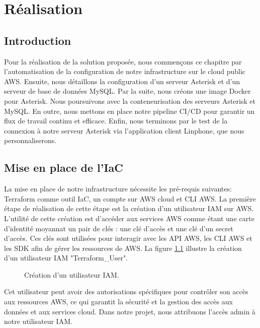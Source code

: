 \chapter{Réalisation}
\section*{Introduction}
Pour la réalisation de la solution proposée, nous commençons ce chapitre par l'automatisation de la configuration de notre infrastructure sur le cloud public AWS. Ensuite, nous détaillons la configuration d'un serveur Asterisk et d'un serveur de base de données MySQL. Par la suite, nous créons une image Docker pour Asterisk. Nous poursuivons avec la conteneurisation des serveurs Asterisk et MySQL. En outre, nous mettons en place notre pipeline CI/CD pour garantir un flux de travail continu et efficace. Enfin, nous terminons par le test de la connexion à notre serveur Asterisk via l'application client Linphone, que nous personnaliserons.
\section{Mise en place de l'IaC}
La mise en place de notre infrastructure nécessite les pré-requis suivantes: Terraform comme outil IaC, un compte sur AWS cloud et CLI AWS.
La première étape de réalisation de cette étape est la création d'un utilisateur IAM sur AWS. L'utilité de cette création est d'accéder aux services AWS comme étant une carte d'identité moyannat un pair de clés : une clé d'accès et une clé d'un secret d'accès. Ces clés sont utilisées pour interagir avec les API AWS, les CLI AWS et les SDK afin de gérer les ressources de AWS.
La figure \ref{fig:terraform_user} illustre la création d'un utilisateur IAM "Terraform\_User". 
\begin{figure}[H]
        \centering
        \caption{Création d'un utilisateur IAM.}
        \label{fig:terraform_user}
\end{figure}
Cet utilisateur peut avoir des autorisations spécifiques pour contrôler son accès aux ressources AWS, ce qui garantit la sécurité et la gestion des accès aux données et aux services cloud. Dans notre projet, nous attribuons l'accès admin à notre utilisateur IAM.\\ 

